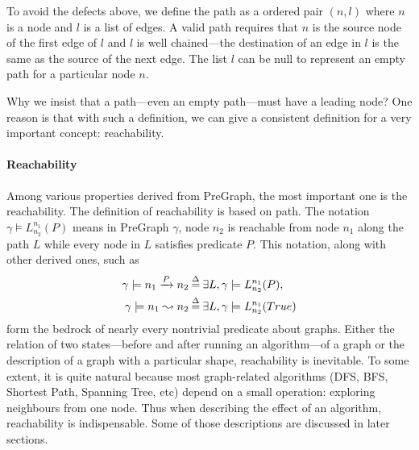 To avoid the defects above, we define the path as a ordered pair $(n,
l)$ where $n$ is a node and $l$ is a list of edges. A valid path
requires that $n$ is the source node of the first edge of $l$ and $l$
is well chained---the destination of an edge in $l$ is the same as the
source of the next edge. The list $l$ can be null to represent an
empty path for a particular node $n$.

Why we insist that a path---even an empty path---must have a leading
node? One reason is that with such a definition, we can give a
consistent definition for a very important concept: reachability.

\paragraph{Reachability}
Among various properties derived from PreGraph, the most important one
is the reachability. The definition of reachability is based on
path. The notation $\gamma \models L_{n_2}^{n_1}(P)$ means in PreGraph
$\gamma$, node $n_2$ is reachable from node $n_1$ along the path $L$
while every node in $L$ satisfies predicate $P$. This notation, along
with other derived ones, such as
\begin{equation*}
\begin{split}
\gamma\models n_1 \xrightarrow{P} n_2 &\mathbin{\stackrel{\Delta}{=}} \exists L, \gamma \models L_{n_2}^{n_1}(P),\\
\gamma\models n_1 \leadsto n_2 &\mathbin{\stackrel{\Delta}{=}} \exists L, \gamma \models L_{n_2}^{n_1}(True)
\end{split}
\end{equation*}
form the bedrock of nearly every nontrivial predicate about
graphs. Either the relation of two states---before and after running
an algorithm---of a graph or the description of a graph with a
particular shape, reachability is inevitable. To some extent, it is
quite natural because most graph-related algorithms (DFS, BFS,
Shortest Path, Spanning Tree, etc) depend on a small operation:
exploring neighbours from one node. Thus when describing the effect of
an algorithm, reachability is indispensable. Some of those
descriptions are discussed in later sections.


